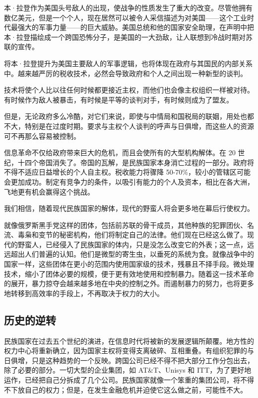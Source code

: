 本·拉登作为美国头号敌人的出现，使战争的性质发生了重大的改变。尽管他拥有数亿美元，但是一个个人，现在居然可以被令人采信描述为对美国——这个工业时代最强大的军事力量——的巨大威胁。美国总统和他的国家安全助理，在声明中把本·拉登描绘成一个跨国恐怖分子，是美国的一大劲敌，让人联想到冷战时期对苏联的宣传。


将本·拉登提升为美国主要敌人的军事逻辑，也将体现在政府与其国民的内部关系中。越来越严厉的税收技术，必然会导致政府和个人之间出现一种新型的谈判。


技术将使个人比以往任何时候都更接近主权，而他们也会像主权组织一样被对待。有时候作为敌人被暴击，有时候是平等的谈判对手，有时候则成为了盟友。


但是，无论政府多么冷酷，对它们来说，即使与中情局和国税局的联姻，用处也都不大，特别是在过度时期。要求与主权个人谈判的呼声与日俱增，而这些人的资源可不再那么容易被控制。


信息革命不仅给政府带来巨大的危机，而且会使所有的大型机构解体。在 20 世纪，十四个帝国消失了。帝国的瓦解，是民族国家本身消亡过程的一部分。政府将不得不适应日益增长的个人自主权。税收能力将骤降 50-70\%，较小的管辖区可能会更加成功。制定有竞争力的条件，以吸引有能力的个人及资本，相比在各大洲，飞地更有机会赢得这个挑战。


我们相信，随着现代民族国家的解体，现代的野蛮人将会更多地在幕后行使权力。


就像俄罗斯黑手党这样的团体，包括前苏联的骨干成员，其他种族的犯罪团伙、名流、毒枭和变节的秘密机构，他们将制定自己的法律。他们现在已经这么做了。现代的野蛮人，已经侵入了民族国家的体内，只是没怎么改变它的外表；这一点，远远超出人们普遍的认知。他们是微型的寄生虫，以垂死的系统为食。就像战争中的国家一样，这些团体在更小的范围内使用国家级的技术，残暴且不择手段。微处理技术，缩小了团体必要的规模，便于更有效地使用和控制暴力。随着这一技术革命的展开，暴力掠夺会越来越多地在中央的控制之外。而遏制暴力的努力，也将更多地转移到高效率的手段上，不再取决于权力的大小。



\subsection{历史的逆转}

民族国家在过去五个世纪的演进，在信息时代将被新的发展逻辑所颠覆。地方性的权力中心将重新确立，因为国家主权将变得支离破碎、互相重叠。有组织犯罪的与日俱增，只是这种趋势的一个反映。跨国公司已经不得不把大部分工作分包出去，除了必要的部分。一切大型的企业集团，如 AT\&T、Unisys 和 ITT，为了更好地运作，已经把自己分拆成了几个公司。民族国家就像一个笨重的集团公司，将不得不下放自己的权力；但是，在发生金融危机并迫使它这么做之前，可能性不大。


